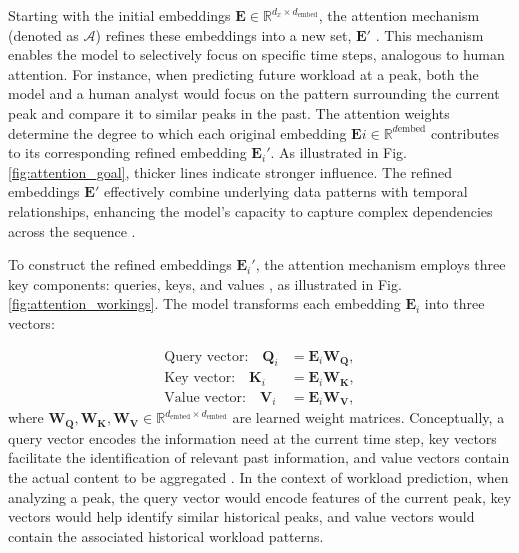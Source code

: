 Starting with the initial embeddings $\mathbf{E} \in \mathbb{R}^{d_x \times d_{\text{embed}}}$, the attention mechanism (denoted as $\mathcal{A}$) refines these embeddings into a new set, $\mathbf{E}'$ \cite{vaswani2017attention}. This mechanism enables the model to selectively focus on specific time steps, analogous to human attention. For instance, when predicting future workload at a peak, both the model and a human analyst would focus on the pattern surrounding the current peak and compare it to similar peaks in the past. The attention weights determine the degree to which each original embedding $\mathbf{E}i \in \mathbb{R}^{d{\text{embed}}}$ contributes to its corresponding refined embedding $\mathbf{E}_i'$. As illustrated in Fig. \ref{fig:attention_goal}, thicker lines indicate stronger influence. The refined embeddings $\mathbf{E}'$ effectively combine underlying data patterns with temporal relationships, enhancing the model's capacity to capture complex dependencies across the sequence \cite{dai2019transformer}.

To construct the refined embeddings $\mathbf{E}_i'$, the attention mechanism employs three key components: queries, keys, and values \cite{vaswani2017attention}, as illustrated in Fig. \ref{fig:attention_workings}. The model transforms each embedding $\mathbf{E}_i$ into three vectors:

\begin{equation}
    \begin{aligned}
        \text{Query vector:} \quad \mathbf{Q}_i &= \mathbf{E}_i \mathbf{W_Q}, \\
        \text{Key vector:} \quad \mathbf{K}_i &= \mathbf{E}_i \mathbf{W_K}, \\
        \text{Value vector:} \quad \mathbf{V}_i &= \mathbf{E}_i \mathbf{W_V},
    \end{aligned}
\end{equation}
where $\mathbf{W_Q}, \mathbf{W_K}, \mathbf{W_V} \in \mathbb{R}^{d_{\text{embed}} \times d_{\text{embed}}}$ are learned weight matrices. Conceptually, a query vector encodes the information need at the current time step, key vectors facilitate the identification of relevant past information, and value vectors contain the actual content to be aggregated \cite{bahdanau2014neural}. In the context of workload prediction, when analyzing a peak, the query vector would encode features of the current peak, key vectors would help identify similar historical peaks, and value vectors would contain the associated historical workload patterns.

